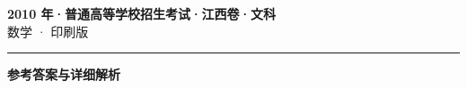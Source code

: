 \documentclass[zihao=5, a4paper]{ctexart}
\begin{document}
\begin{center}
  {\Large\bfseries 2010 年·普通高等学校招生考试·江西卷·文科}\\[4pt]
  {\large 数学 · 印刷版}
\end{center}
\medskip
{}

\par\bigskip\hrule\bigskip
{}
\begin{center}{\large\bfseries 参考答案与详细解析}\end{center}
\smallskip

\end{document}
